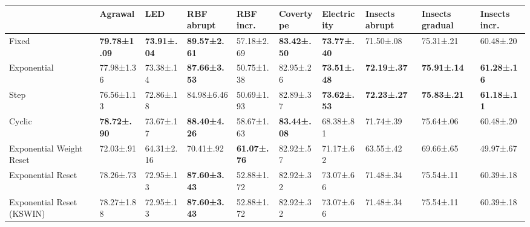 \begin{tabular}{llllllllll}
    \toprule
                              & Agrawal              & LED                 & RBF abrupt           & RBF incr.           & Covertype           & Electricity         & Insects abrupt      & Insects gradual     & Insects incr.       \\ \midrule
    Fixed                     & \bfseries 79.78±1.09 & \bfseries 73.91±.04 & \bfseries 89.57±2.61 & 57.18±2.69          & \bfseries 83.42±.50 & \bfseries 73.77±.40 & 71.50±.08           & 75.31±.21           & 60.48±.20           \\
    Exponential               & 77.98±1.36           & 73.38±.14           & \bfseries 87.66±3.53 & 50.75±1.38          & 82.95±.26           & \bfseries 73.51±.48 & \bfseries 72.19±.37 & \bfseries 75.91±.14 & \bfseries 61.28±.16 \\
    Step                      & 76.56±1.13           & 72.86±.18           & 84.98±6.46           & 50.69±1.93          & 82.89±.37           & \bfseries 73.62±.53 & \bfseries 72.23±.27 & \bfseries 75.83±.21 & \bfseries 61.18±.11 \\
    Cyclic                    & \bfseries 78.72±.90  & 73.67±.17           & \bfseries 88.40±4.26 & 58.67±1.63          & \bfseries 83.44±.08 & 68.38±.81           & 71.74±.39           & 75.64±.06           & 60.48±.20           \\
    Exponential Weight Reset  & 72.03±.91            & 64.31±2.16          & 70.41±.92            & \bfseries 61.07±.76 & 82.92±.57           & 71.17±.62           & 63.55±.42           & 69.66±.65           & 49.97±.67           \\
    Exponential Reset         & 78.26±.73            & 72.95±.13           & \bfseries 87.60±3.43 & 52.88±1.72          & 82.92±.32           & 73.07±.66           & 71.48±.34           & 75.54±.11           & 60.39±.18           \\
    Exponential Reset (KSWIN) & 78.27±1.88           & 72.95±.13           & \bfseries 87.60±3.43 & 52.88±1.72          & 82.92±.32           & 73.07±.66           & 71.48±.34           & 75.54±.11           & 60.39±.18           \\
    \bottomrule
\end{tabular}

